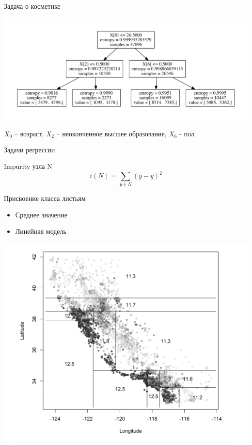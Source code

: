 \documentclass[10pt]{beamer}
\begin{document}
\begin{frame}{Задача о косметике}

\begin{center}
\includegraphics[scale=0.45]{images/model.pdf}
\end{center}

$X_0$ -- возраст, $X_2$ -- неоконченное высшее образование, $X_6$ - пол

\end{frame}

\begin{frame}{Задачи регрессии}

Impurity узла N
\[
i(N) = \sum_{y \in N} (y - \overline{y})^2
\]

Присвоение класса листьям
\begin{itemize}
\item Среднее значение
\item Линейная модель
\end{itemize}

\includegraphics[scale=0.4]{images/housing.png}

\end{frame}
\end{document}
